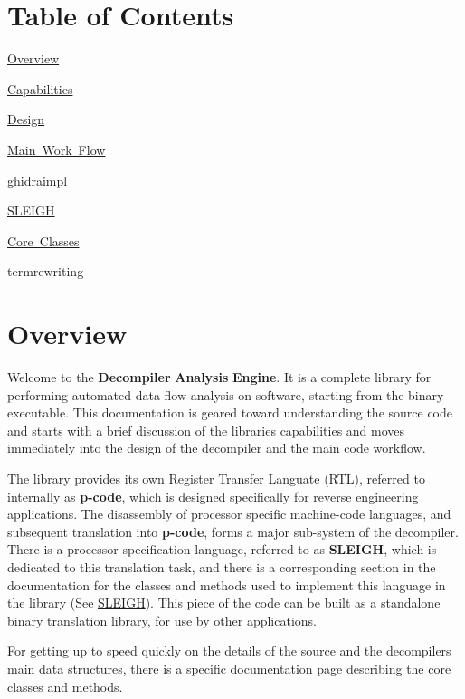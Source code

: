 \hypertarget{index_toc}{}\section{Table of Contents}\label{index_toc}

\begin{DoxyItemize}
\item \mbox{\hyperlink{index_overview}{Overview}}
\item \mbox{\hyperlink{index_capabilities}{Capabilities}}
\item \mbox{\hyperlink{index_design}{Design}}
\item \mbox{\hyperlink{index_workflow}{Main Work Flow}}
\item ghidraimpl
\item \mbox{\hyperlink{sleigh}{S\+L\+E\+I\+GH}}
\item \mbox{\hyperlink{coreclasses}{Core Classes}}
\item termrewriting
\end{DoxyItemize}\hypertarget{index_overview}{}\section{Overview}\label{index_overview}
Welcome to the {\bfseries{Decompiler}} {\bfseries{Analysis}} {\bfseries{Engine}}. It is a complete library for performing automated data-\/flow analysis on software, starting from the binary executable. This documentation is geared toward understanding the source code and starts with a brief discussion of the libraries capabilities and moves immediately into the design of the decompiler and the main code workflow.

The library provides its own Register Transfer Languate (R\+TL), referred to internally as {\bfseries{p-\/code}}, which is designed specifically for reverse engineering applications. The disassembly of processor specific machine-\/code languages, and subsequent translation into {\bfseries{p-\/code}}, forms a major sub-\/system of the decompiler. There is a processor specification language, referred to as {\bfseries{S\+L\+E\+I\+GH}}, which is dedicated to this translation task, and there is a corresponding section in the documentation for the classes and methods used to implement this language in the library (See \mbox{\hyperlink{sleigh}{S\+L\+E\+I\+GH}}). This piece of the code can be built as a standalone binary translation library, for use by other applications.

For getting up to speed quickly on the details of the source and the decompiler\textquotesingle{}s main data structures, there is a specific documentation page describing the core classes and methods.

